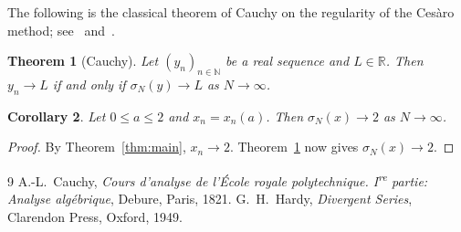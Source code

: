 \documentclass[11pt]{amsart}
\newtheorem{theorem}{Theorem}[section]
\newtheorem{corollary}[theorem]{Corollary}
\theoremstyle{definition}
\begin{document}
The following is the classical theorem of Cauchy on the regularity of the
Ces\`aro method; see~\cite{Cau21} and~\cite[Chapter~V]{Har49}.

\begin{theorem}[Cauchy]\label{thm:cauchy}
Let $(y_n)_{n\in\mathbb N}$ be a real sequence and $L\in\mathbb R$. Then
$y_n\to L$ if and only if $\sigma_N(y)\to L$ as $N\to\infty$.
\end{theorem}

\begin{corollary}\label{cor:cesaro}
Let $0\le a\le 2$ and $x_n=x_n(a)$. Then $\sigma_N(x)\to 2$ as
$N\to\infty$.
\end{corollary}

\begin{proof}
By Theorem~\ref{thm:main}, $x_n\to 2$. Theorem~\ref{thm:cauchy} now gives
$\sigma_N(x)\to 2$.
\end{proof}

\begin{thebibliography}{9}
 A.-L.~Cauchy, \emph{Cours d'analyse de l'\'Ecole royale
polytechnique. I\textsuperscript{re} partie: Analyse alg\'ebrique}, Debure,
Paris, 1821.
 G.~H.~Hardy, \emph{Divergent Series}, Clarendon Press,
Oxford, 1949.
\end{thebibliography}
\end{document}
